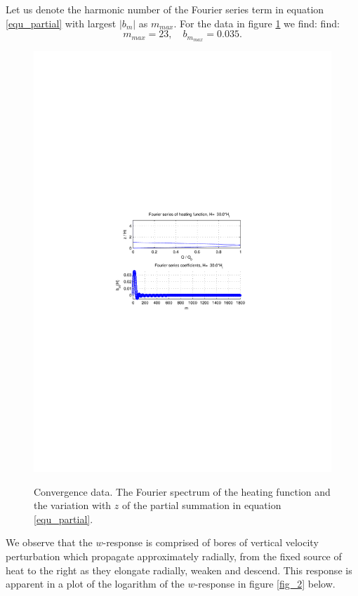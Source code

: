 \documentclass[12pt]{article}
\begin{document}
Let us denote the harmonic number of the Fourier series term in equation \ref{equ_partial} with largest $|b_m|$ as $m_{max}$. For the data in figure \ref{fig_1} we find:
find:
%
\begin{equation}
m_{max} = 23, \quad b_{m_{max}} = 0.035. 
\end{equation}
%
%
%
\begin{figure}[h]
\caption{Convergence data. The Fourier spectrum of the heating function and the variation with $z$ of the partial summation in equation \ref{equ_partial}. } 
\includegraphics[scale=1.0,angle=-0] {fig1.pdf} 
\label{fig_1}
\end{figure}
%
%
%
We observe that the $w$-response is comprised of bores of vertical velocity perturbation which propagate approximately radially, from the fixed source of heat to the right 
as they elongate radially, weaken and descend. This response is apparent in a plot of the logarithm of the $w$-response in figure \ref{fig_2} below. 
\end{document}
